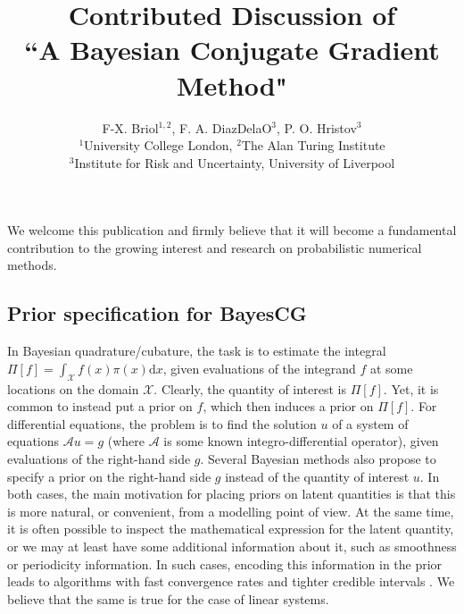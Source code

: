 \documentclass[twoside]{article}
\title{Contributed Discussion of \\``A Bayesian Conjugate Gradient Method"}
\author{F-X. Briol$^{1,2}$, F. A. DiazDelaO$^{3}$, P. O. Hristov$^{3}$\\ $^{1}$University College London, $^{2}$The Alan Turing Institute \\ $^{3}$Institute for Risk and Uncertainty, University of Liverpool}
\begin{document}
\maketitle
		We welcome this publication \cite{Cockayne2019} and firmly believe that it will become a fundamental contribution to the growing interest and research on probabilistic numerical methods.
		
	\subsection*{Prior specification for BayesCG}

		In Bayesian quadrature/cubature, the task is to estimate the integral $\Pi[f] = \int_{\mathcal{X}} f(x) \pi(x) \mathrm{d}x$, given evaluations of the integrand $f$ at some locations on the domain $\mathcal{X}$. Clearly, the quantity of interest is 
		$\Pi[f]$. Yet, it is common to instead put a prior on $f$, which then induces a prior on $\Pi[f]$. For differential equations, the problem is to find the solution $u$ of a system of equations $\mathcal{A} u =g$ (where $\mathcal{A}$ is some known integro-differential operator), given evaluations of the right-hand side $g$. Several Bayesian methods \citep{Cockayne2016,Chkrebtii2016} also propose to specify a prior on the right-hand side $g$ instead of the quantity of interest $u$.
		In both cases, the main motivation for placing priors on latent quantities is that this is more natural, or convenient, from a modelling point of view. At the same time, it is often possible to inspect the mathematical expression for the latent quantity, or we may at least have some additional information about it, such as smoothness or periodicity information. In such cases, encoding this information in the prior leads to algorithms with fast convergence rates and tighter credible intervals \cite{Cockayne2016,Briol2019PI}. We believe that the same is true for the case of linear systems.
		
\end{document}

